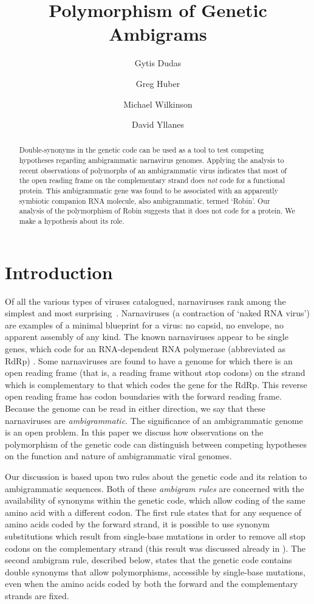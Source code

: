 \documentclass[9pt,lineno]{elife}
\title{Polymorphism of Genetic Ambigrams}
\author[1]{Gytis Dudas}
\author[2]{Greg Huber}
\author[2,3,*]{Michael Wilkinson}
\author[2]{David  Yllanes}
\affil[1]{Gothenburg Global Biodiversity Centre, Carl Skottsbergs gata 22B, 413 19, Gothenburg, Sweden}
\affil[2]{Chan Zuckerberg Biohub, 499 Illinois Street, San Francisco, CA 94158, USA}
\affil[3]{School of Mathematics and Statistics, The Open University, Walton Hall, 
Milton Keynes, MK7 6AA, UK}
\newcommand{\MW}[1]{{\color{magenta}{#1}}}
\begin{document}
 \maketitle

\begin{abstract}

Double-synonyms in the genetic code can be used as a tool to
test competing hypotheses regarding ambigrammatic 
narnavirus genomes. Applying the analysis to recent observations of polymorphs of 
an ambigrammatic virus indicates that most of the open reading frame on the 
complementary strand does \emph{not} code for a functional protein. This ambigrammatic 
gene was found to be associated with an apparently symbiotic companion RNA 
molecule, also ambigrammatic, termed \lq Robin'. Our analysis of the polymorphism of Robin suggests 
that it does not code for a protein. We make a hypothesis about its role.  
\end{abstract}

\section{Introduction}
\label{sec: 1}
Of all the various types of viruses catalogued, narnaviruses rank among the simplest
and most surprising~\cite{Cob+16}.  Narnaviruses (a contraction of \lq naked RNA virus')
are examples of a minimal blueprint for a virus: no capsid, no envelope, no apparent
assembly of any kind. The known narnaviruses appear to be single genes, which code for an
RNA-dependent RNA polymerase
(abbreviated as RdRp) \cite{Hillman2013}. Some narnaviruses 
are found to have a genome for which there is an open reading frame (that is, a reading frame without 
stop codons) on the strand which is complementary to that which codes the gene for the RdRp. 
This reverse open reading frame has codon boundaries \MW{aligned} with the forward reading 
frame. Because the genome can be read in either direction, we say that these narnaviruses 
are \emph{ambigrammatic}. The significance of an ambigrammatic genome is an open problem. 
In this paper we discuss how observations on the polymorphism of the genetic code can distinguish 
between competing hypotheses on the function and nature of ambigrammatic viral genomes.

Our discussion is based upon two rules about the genetic code and its relation to ambigrammatic 
sequences. Both of these \emph{ambigram rules} are concerned with the availability of synonyms within 
the genetic code, which allow coding of the same amino acid with a different codon. 
The first rule states that for any sequence of amino acids coded by the forward strand, 
it is possible to use synonym substitutions which result from single-base mutations in order to remove 
all stop codons on the complementary strand (this result was discussed already in \cite{DeR+19}). 
The second ambigram rule, described below, states that the genetic code contains double 
synonyms that allow polymorphisms, accessible by single-base mutations, even when the 
amino acids coded by both the forward and the complementary strands are fixed. 
\end{document}
